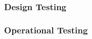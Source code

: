\subsubsection{Design Testing}
\label{loc:StageSevenDT}
\renewcommand{\TestIdName}{DT}%
\renewcommand{\TestIdNameX}{\StageDT}%


\subsubsection{Operational Testing}
\label{loc:StageSevenOT}
\renewcommand{\TestIdName}{OT}%
\renewcommand{\TestIdNameX}{\StageOT}%


